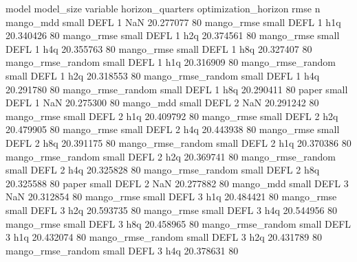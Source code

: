             model model_size variable  horizon_quarters optimization_horizon      rmse  n
        mango_mdd      small     DEFL                 1                  NaN 20.277077 80
       mango_rmse      small     DEFL                 1                  h1q 20.340426 80
       mango_rmse      small     DEFL                 1                  h2q 20.374561 80
       mango_rmse      small     DEFL                 1                  h4q 20.355763 80
       mango_rmse      small     DEFL                 1                  h8q 20.327407 80
mango_rmse_random      small     DEFL                 1                  h1q 20.316909 80
mango_rmse_random      small     DEFL                 1                  h2q 20.318553 80
mango_rmse_random      small     DEFL                 1                  h4q 20.291780 80
mango_rmse_random      small     DEFL                 1                  h8q 20.290411 80
            paper      small     DEFL                 1                  NaN 20.275300 80
        mango_mdd      small     DEFL                 2                  NaN 20.291242 80
       mango_rmse      small     DEFL                 2                  h1q 20.409792 80
       mango_rmse      small     DEFL                 2                  h2q 20.479905 80
       mango_rmse      small     DEFL                 2                  h4q 20.443938 80
       mango_rmse      small     DEFL                 2                  h8q 20.391175 80
mango_rmse_random      small     DEFL                 2                  h1q 20.370386 80
mango_rmse_random      small     DEFL                 2                  h2q 20.369741 80
mango_rmse_random      small     DEFL                 2                  h4q 20.325828 80
mango_rmse_random      small     DEFL                 2                  h8q 20.325588 80
            paper      small     DEFL                 2                  NaN 20.277882 80
        mango_mdd      small     DEFL                 3                  NaN 20.312854 80
       mango_rmse      small     DEFL                 3                  h1q 20.484421 80
       mango_rmse      small     DEFL                 3                  h2q 20.593735 80
       mango_rmse      small     DEFL                 3                  h4q 20.544956 80
       mango_rmse      small     DEFL                 3                  h8q 20.458965 80
mango_rmse_random      small     DEFL                 3                  h1q 20.432074 80
mango_rmse_random      small     DEFL                 3                  h2q 20.431789 80
mango_rmse_random      small     DEFL                 3                  h4q 20.378631 80
